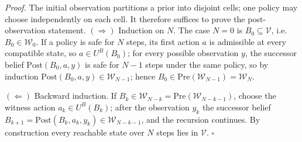 \documentclass[11pt]{article}
\theoremstyle{definition}
\begin{document}
\emph{Proof.} The initial observation partitions a prior into
disjoint cells; one policy may choose independently on each cell. It
therefore suffices to prove the post-observation statement.
\((\Rightarrow)\) Induction on \(N\). The case \(N=0\) is
\(B_0\subseteq\mathcal V\), i.e.\ \(B_0\in\mathcal W_0\). If a policy is
safe for \(N\) steps, its first action \(a\) is admissible at every
compatible state, so \(a\in U^B(B_0)\); for every possible observation
\(y\), the successor belief \(\mathrm{Post}(B_0,a,y)\) is safe for \(N-1\)
steps under the same policy, so by induction
\(\mathrm{Post}(B_0,a,y)\in\mathcal W_{N-1}\); hence
\(B_0\in\mathrm{Pre}(\mathcal W_{N-1})=\mathcal W_N\).

\((\Leftarrow)\) Backward induction. If \(B_k\in\mathcal W_{N-k} =
\mathrm{Pre}(\mathcal W_{N-k-1})\), choose the witness action
\(a_k\in U^B(B_k)\); after the observation \(y_k\) the successor belief
\(B_{k+1}=\mathrm{Post}(B_k,a_k,y_k)\in\mathcal W_{N-k-1}\), and the
recursion continues. By construction every reachable state over \(N\)
steps lies in \(\mathcal V\). \ensuremath{\square}
\end{document}

